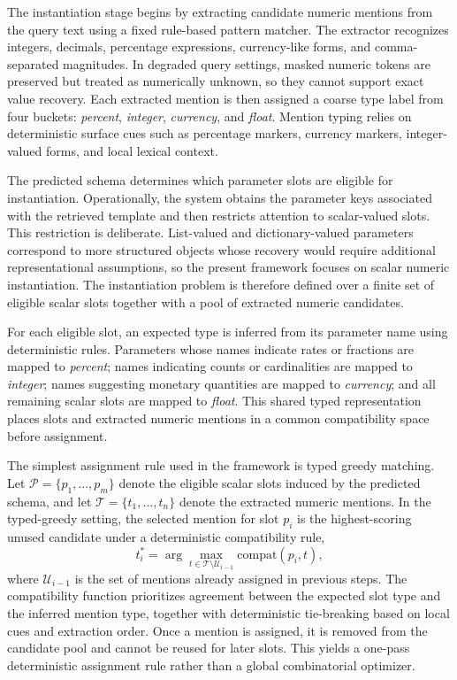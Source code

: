 \documentclass[3p]{elsarticle}
\begin{document}
The instantiation stage begins by extracting candidate numeric mentions from the query text using a fixed rule-based pattern matcher. The extractor recognizes integers, decimals, percentage expressions, currency-like forms, and comma-separated magnitudes. In degraded query settings, masked numeric tokens are preserved but treated as numerically unknown, so they cannot support exact value recovery. Each extracted mention is then assigned a coarse type label from four buckets: \emph{percent}, \emph{integer}, \emph{currency}, and \emph{float}. Mention typing relies on deterministic surface cues such as percentage markers, currency markers, integer-valued forms, and local lexical context.

The predicted schema determines which parameter slots are eligible for instantiation. Operationally, the system obtains the parameter keys associated with the retrieved template and then restricts attention to scalar-valued slots. This restriction is deliberate. List-valued and dictionary-valued parameters correspond to more structured objects whose recovery would require additional representational assumptions, so the present framework focuses on scalar numeric instantiation. The instantiation problem is therefore defined over a finite set of eligible scalar slots together with a pool of extracted numeric candidates.

For each eligible slot, an expected type is inferred from its parameter name using deterministic rules. Parameters whose names indicate rates or fractions are mapped to \emph{percent}; names indicating counts or cardinalities are mapped to \emph{integer}; names suggesting monetary quantities are mapped to \emph{currency}; and all remaining scalar slots are mapped to \emph{float}. This shared typed representation places slots and extracted numeric mentions in a common compatibility space before assignment.

The simplest assignment rule used in the framework is typed greedy matching. Let $\mathcal{P}=\{p_1,\dots,p_m\}$ denote the eligible scalar slots induced by the predicted schema, and let $\mathcal{T}=\{t_1,\dots,t_n\}$ denote the extracted numeric mentions. In the typed-greedy setting, the selected mention for slot $p_i$ is the highest-scoring unused candidate under a deterministic compatibility rule,
\begin{equation}
t_i^{*} = \arg\max_{t \in \mathcal{T}\setminus \mathcal{U}_{i-1}} \mathrm{compat}(p_i,t),
\label{eq:typed_assignment}
\end{equation}
where $\mathcal{U}_{i-1}$ is the set of mentions already assigned in previous steps. The compatibility function prioritizes agreement between the expected slot type and the inferred mention type, together with deterministic tie-breaking based on local cues and extraction order. Once a mention is assigned, it is removed from the candidate pool and cannot be reused for later slots. This yields a one-pass deterministic assignment rule rather than a global combinatorial optimizer.
\end{document}
